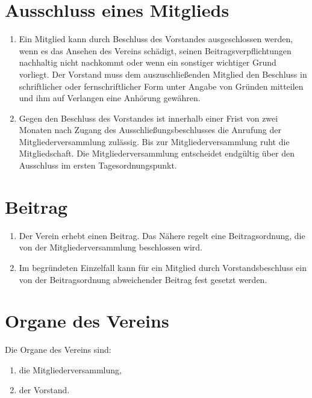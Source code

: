 \documentclass[a4paper]{article}
\begin{document}
\section{Ausschluss eines Mitglieds}
\begin{enumerate}
    \item Ein Mitglied kann durch Beschluss des Vorstandes ausgeschlossen werden, wenn es das Ansehen des Vereins schädigt, seinen Beitragsverpflichtungen nachhaltig nicht nachkommt oder wenn ein sonstiger wichtiger Grund vorliegt. Der Vorstand muss dem auszuschließenden Mitglied den Beschluss in schriftlicher oder fernschriftlicher Form unter Angabe von Gründen mitteilen und ihm auf Verlangen eine Anhörung gewähren.
    \item Gegen den Beschluss des Vorstandes ist innerhalb einer Frist von zwei Monaten nach Zugang des Ausschließungsbeschlusses die Anrufung der Mitgliederversammlung zulässig. Bis zur Mitgliederversammlung ruht die Mitgliedschaft. Die Mitgliederversammlung entscheidet endgültig über den Ausschluss im ersten Tagesordnungspunkt.
\end{enumerate}

\section{Beitrag}
\begin{enumerate}
    \item Der Verein erhebt einen Beitrag. Das Nähere regelt eine Beitragsordnung, die von der Mitgliederversammlung beschlossen wird.
    \item Im begründeten Einzelfall kann für ein Mitglied durch Vorstandsbeschluss ein von der Beitragsordnung abweichender Beitrag fest gesetzt werden.
\end{enumerate}

\section{Organe des Vereins}
Die Organe des Vereins sind:
\begin{enumerate}[1.]
    \item die Mitgliederversammlung,
    \item der Vorstand.
\end{enumerate}
\end{document}
